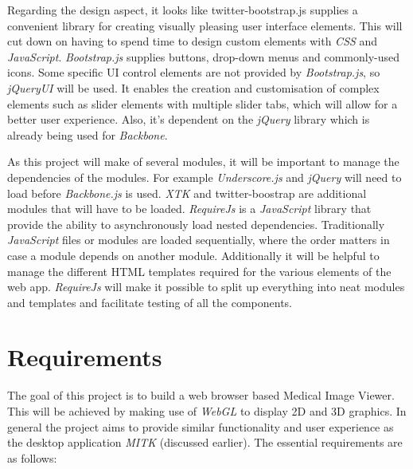 \documentclass[a4paper,11pt,titlepage]{article}
\begin{document}
Regarding the design aspect, it looks like twitter-bootstrap.js supplies a convenient library for creating visually pleasing user interface elements. This will cut down on having to spend time to design custom elements with \textit{CSS} and \textit{JavaScript}. \textit{Bootstrap.js} supplies buttons, drop-down menus and commonly-used icons. Some specific UI control elements are not provided by \textit{Bootstrap.js}, so \textit{jQueryUI} will be used. It enables the creation and customisation of complex elements such as slider elements with multiple slider tabs, which will allow for a better user experience. Also, it's dependent on the \textit{jQuery} library which is already being used for \textit{Backbone}.

As this project will make of several modules, it will be important to manage the dependencies of the modules. For example \textit{Underscore.js} and \textit{jQuery} will need to load before \textit{Backbone.js} is used. \textit{XTK} and twitter-boostrap are additional modules that will have to be loaded. \textit{RequireJs} is a \textit{JavaScript} library that provide the ability to asynchronously load nested dependencies. Traditionally \textit{JavaScript} files or modules are loaded sequentially, where the order matters in case a module depends on another module. Additionally it will be helpful to manage the different HTML templates required for the various elements of the web app. \textit{RequireJs} will make it possible to split up everything into neat modules and templates and facilitate testing of all the components.




\section{Requirements}

The goal of this project is to build a web browser based Medical Image Viewer. This will be achieved by making use of \textit{WebGL} to display 2D and 3D graphics. In general the project aims to provide similar functionality and user experience as the desktop application \textit{MITK} (discussed earlier). The essential requirements are as follows:
\end{document}
